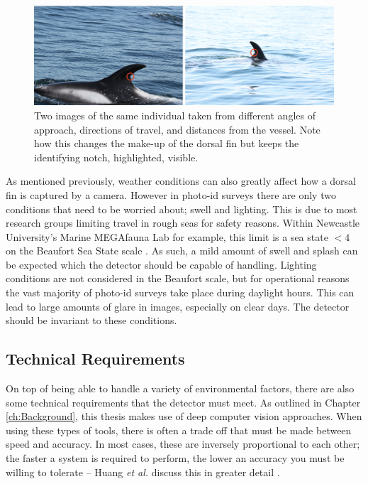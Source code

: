   \begin{figure}
 	\begin{center}
 		\includegraphics[scale=0.6]{Chapter3/figs/angle-size-example.png}
 	\end{center}
 	\caption[Two images of the same individual taken from different angles of approach, directions of travel, and distances from the vessel.]{Two images of the same individual taken from different angles of approach, directions of travel, and distances from the vessel. Note how this changes the make-up of the dorsal fin but keeps the identifying notch, highlighted, visible. 
 	}
 	\label{fig:angle-eg}
 \end{figure}
 
 As mentioned previously, weather conditions can also greatly affect how a dorsal fin is captured by a camera. However in photo-id surveys there are only two conditions that need to be worried about; swell and lighting. This is due to most research groups limiting travel in rough seas for safety reasons. Within Newcastle University's Marine MEGAfauna Lab for example, this limit is a sea state $<4$ on the Beaufort Sea State scale \cite{world_meteorologicial_society_beaufort_1970}. As such, a mild amount of swell and splash can be expected which the detector should be capable of handling. Lighting conditions are not considered in the Beaufort scale, but for operational reasons the vast majority of photo-id surveys take place during daylight hours. This can lead to large amounts of glare in images, especially on clear days. The detector should be invariant to these conditions. 
 
 \subsection{Technical Requirements}\label{ch:cetDet,sec:requirements,sub:technical}
 
On top of being able to handle a variety of environmental factors, there are also some technical requirements that the detector must meet. As outlined in Chapter \ref{ch:Background}, this thesis makes use of deep computer vision approaches. When using these types of tools, there is often a trade off that must be made between speed and accuracy. In most cases, these are inversely proportional to each other; the faster a system is required to perform, the lower an accuracy you must be willing to tolerate -- Huang \textit{et al.} discuss this in greater detail \cite{huang_speedaccuracy_2017}.
 

